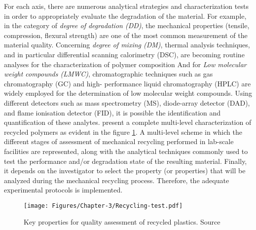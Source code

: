 For each axis, there are numerous analytical strategies and characterization tests in order to appropriately  evaluate the degradation of the material.
For example, in the category of \textit{degree of degradation (DD)}, the mechanical properties (tensile, compression, flexural strength) are one of the most common measurement of the material quality.
Concerning \textit{degree of mixing (DM)}, thermal analysis techniques, and in particular differential scanning calorimetry (DSC), are becoming routine analyses for the characterization of polymer composition
And for \textit{Low molecular weight compounds (LMWC)}, chromatographic techniques such as gas chromatography (GC) and high- performance liquid chromatography (HPLC) are widely employed for the determination of low molecular weight compounds.
Using different detectors such as mass spectrometry (MS), diode-array detector (DAD), and flame ionisation detector (FID), it is possible  the identification and quantification of these analytes.
\textcite{Badia2016} present a complete multi-level characterization of recycled polymers as evident in the figure \ref{Chap-3:Fig.Recycling.Test}.
A multi-level scheme in which the different stages of assessment of mechanical recycling performed in lab-scale facilities are represented, along with the analytical techniques commonly used to test the performance and/or degradation state of the resulting material.
Finally, it depends on the investigator to select the property (or properties) that will be analyzed during the mechanical recycling process.
Therefore, the adequate experimental protocols is implemented. 


\begin{figure}[!hbt]
	\centering
	\texttt{[image: Figures/Chapter-3/Recycling-test.pdf]}
	\caption{Key properties for quality assessment of recycled plastics. Source  \parencite{Badia2016}}
	\label{Chap-3:Fig.Recycling.Test}
\end{figure}
\newpage

